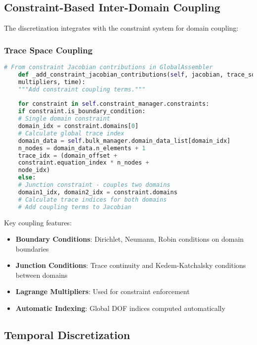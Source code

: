 \subsection{Constraint-Based Inter-Domain Coupling}
\label{subsec:interdomain_coupling}

The discretization integrates with the constraint system for domain coupling:

\subsubsection{Trace Space Coupling}

\begin{lstlisting}[language=Python, caption=Constraint-Based Coupling]
	# From constraint Jacobian contributions in GlobalAssembler
	def _add_constraint_jacobian_contributions(self, jacobian, trace_solutions, 
	multipliers, time):
	"""Add constraint coupling terms."""
	
	for constraint in self.constraint_manager.constraints:
	if constraint.is_boundary_condition:
	# Single domain constraint
	domain_idx = constraint.domains[0]
	# Calculate global trace index
	domain_data = self.bulk_manager.domain_data_list[domain_idx]
	n_nodes = domain_data.n_elements + 1
	trace_idx = (domain_offset + 
	constraint.equation_index * n_nodes + 
	node_idx)
	else:
	# Junction constraint - couples two domains
	domain1_idx, domain2_idx = constraint.domains
	# Calculate trace indices for both domains
	# Add coupling terms to Jacobian
\end{lstlisting}

Key coupling features:
\begin{itemize}
	\item \textbf{Boundary Conditions}: Dirichlet, Neumann, Robin conditions on domain boundaries
	\item \textbf{Junction Conditions}: Trace continuity and Kedem-Katchalsky conditions between domains
	\item \textbf{Lagrange Multipliers}: Used for constraint enforcement
	\item \textbf{Automatic Indexing}: Global DOF indices computed automatically
\end{itemize}

\subsection{Temporal Discretization}
\label{subsec:temporal_discretization}


